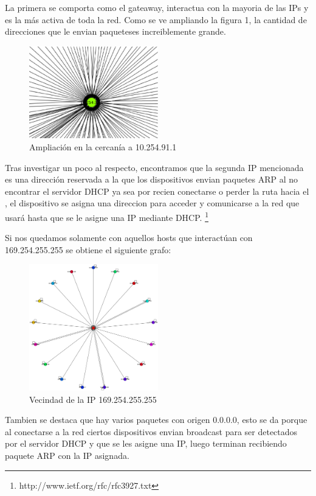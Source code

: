 	\par La primera se comporta como el gateaway, interactua con la mayoria de las IPs y es la más activa de toda la red.   Como se ve ampliando la figura 1, la cantidad de direcciones que le envian paqueteses increiblemente grande.


\begin{figure}[H]
		\centering
		\includegraphics[width=0.5\textwidth]{img/graph/escenario_3/10254.eps}
		\caption{Ampliación en la cercan\'ia a 10.254.91.1}
		\label{fig:gateway_escenario3}
\end{figure}
	\par Tras investigar un poco al respecto, encontramos que la segunda IP mencionada es una dirección reservada  a la que los dispositivos envian paquetes ARP al no encontrar el servidor DHCP ya sea por recien conectarse o perder la ruta hacia el , el dispositivo se asigna una direccion para acceder y comunicarse a la red que usará hasta que se le asigne una IP mediante DHCP. \footnote{http://www.ietf.org/rfc/rfc3927.txt}
	\par Si nos quedamos solamente con aquellos hosts que interactúan con 169.254.255.255 se obtiene el siguiente grafo:   

\begin{figure}[H]
		\centering
		\includegraphics[width=0.5\textwidth]{img/graph/escenario_3/169254_aislado.eps}
		\caption{Vecindad de la IP 169.254.255.255}
		\label{fig:v1_escenario3}
\end{figure}
	\par Tambien se destaca que hay varios paquetes con origen 0.0.0.0, esto se da porque  al conectarse a la red ciertos dispositivos  envian broadcast para ser detectados por el servidor DHCP y que se les asigne una IP, luego terminan recibiendo paquete ARP con la IP asignada.
    
